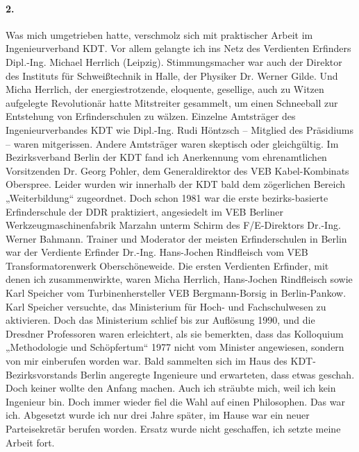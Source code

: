 \documentclass[12pt,a4paper]{article}
\begin{document}
\paragraph{2.}
Was mich umgetrieben hatte, verschmolz sich mit praktischer Arbeit im
Ingenieurverband KDT. Vor allem gelangte ich ins Netz des Verdienten Erfinders
Dipl.-Ing. Michael Herrlich (Leipzig). Stimmungsmacher war auch der Direktor
des Instituts für Schweißtechnik in Halle, der Physiker Dr. Werner Gilde. Und
Micha Herrlich, der energiestrotzende, eloquente, gesellige, auch zu Witzen
aufgelegte Revolutionär hatte Mitstreiter gesammelt, um einen Schneeball zur
Entstehung von Erfinderschulen zu wälzen. Einzelne Amtsträger des
Ingenieurverbandes KDT wie Dipl.-Ing. Rudi Höntzsch – Mitglied des Präsidiums
– waren mitgerissen. Andere Amtsträger waren skeptisch oder gleichgültig. Im
Bezirksverband Berlin der KDT fand ich Anerkennung vom ehrenamtlichen
Vorsitzenden Dr. Georg Pohler, dem Generaldirektor des VEB Kabel-Kombinats
Oberspree. Leider wurden wir innerhalb der KDT bald dem zögerlichen Bereich
„Weiterbildung“ zugeordnet. Doch schon 1981 war die erste bezirks-basierte
Erfinderschule der DDR praktiziert, angesiedelt im VEB Berliner
Werkzeugmaschinenfabrik Marzahn unterm Schirm des F/E-Direktors
Dr.-Ing. Werner Bahmann. Trainer und Moderator der meisten Erfinderschulen in
Berlin war der Verdiente Erfinder Dr.-Ing. Hans-Jochen Rindfleisch vom VEB
Transformatorenwerk Oberschöneweide. Die ersten Verdienten Erfinder, mit denen
ich zusammenwirkte, waren Micha Herrlich, Hans-Jochen Rindfleisch sowie Karl
Speicher vom Turbinenhersteller VEB Bergmann-Borsig in Berlin-Pankow. Karl
Speicher versuchte, das Ministerium für Hoch- und Fachschulwesen zu
aktivieren.  Doch das Ministerium schlief bis zur Auflösung 1990, und die
Dresdner Professoren waren erleichtert, als sie bemerkten, dass das Kolloquium
„Methodologie und Schöpfertum“ 1977 nicht vom Minister angewiesen, sondern von
mir einberufen worden war. Bald sammelten sich im Haus des
KDT-Bezirksvorstands Berlin angeregte Ingenieure und erwarteten, dass etwas
geschah.  Doch keiner wollte den Anfang machen. Auch ich sträubte mich, weil
ich kein Ingenieur bin. Doch immer wieder fiel die Wahl auf einen Philosophen.
Das war ich. Abgesetzt wurde ich nur drei Jahre später, im Hause war ein neuer
Parteisekretär berufen worden. Ersatz wurde nicht geschaffen, ich setzte meine
Arbeit fort.
\end{document}

